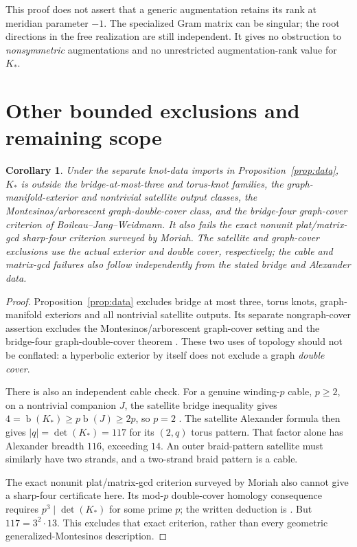 \documentclass[11pt]{article}
\newtheorem{corollary}[theorem]{Corollary}
\newcommand{\br}{\operatorname{b}}
\begin{document}
This proof does not assert that a generic augmentation retains
its rank at meridian parameter $-1$. The specialized Gram matrix
can be singular; the root directions in the free realization
are still independent. It gives no obstruction to
\emph{nonsymmetric} augmentations and no unrestricted
augmentation-rank value for $K_*$.

\section{Other bounded exclusions and remaining scope}

\begin{corollary}\label{cor:otherfamilies}
Under the separate knot-data imports in Proposition~\ref{prop:data},
$K_*$ is outside the bridge-at-most-three and torus-knot families,
the graph-manifold-exterior and nontrivial satellite output classes,
the Montesinos/arborescent graph-double-cover class, and the
bridge-four graph-cover criterion of Boileau--Jang--Weidmann.
It also fails the exact nonunit plat/matrix-gcd sharp-four
criterion surveyed by Moriah. The satellite and graph-cover
exclusions use the actual exterior and double cover, respectively;
the cable and matrix-gcd failures also follow independently from
the stated bridge and Alexander data.
\end{corollary}
\begin{proof}
Proposition~\ref{prop:data} excludes bridge at most three,
torus knots, graph-manifold exteriors and all nontrivial satellite
outputs. Its separate nongraph-cover assertion excludes the
Montesinos/arborescent graph-cover setting
\cite[Introduction, pp.~vi--vii]{bs} and the bridge-four
graph-double-cover theorem \cite[Corollary~1.3]{bjw}.
These two uses of topology should not be conflated:
a hyperbolic exterior by itself does not exclude a graph
\emph{double cover}.

There is also an independent cable check. For a genuine
winding-$p$ cable, $p\ge2$, on a nontrivial companion $J$, the satellite
bridge inequality gives
$4=\br(K_*)\ge p\br(J)\ge2p$, so $p=2$
\cite[Theorem~1, p.~4]{schultens}. The satellite Alexander formula
\cite[Theorem~2 and its Seifert corollary, p.~222]{lm}
then gives $|q|=\det(K_*)=117$ for its $(2,q)$ torus pattern.
That factor alone has Alexander breadth $116$, exceeding $14$.
An outer braid-pattern satellite must similarly have two strands,
and a two-strand braid pattern is a cable.

The exact nonunit plat/matrix-gcd criterion surveyed by Moriah
\cite[Theorem~4.20]{moriah} also cannot give a sharp-four
certificate here. Its mod-$p$ double-cover homology consequence
requires $p^3\mid\det(K_*)$ for some prime $p$; the written
deduction is \cite[Corollary \texttt{cor:plat}]{gcd}.
But $117=3^2\cdot13$. This excludes that exact criterion,
rather than every geometric generalized-Montesinos description.
\end{proof}
\end{document}
